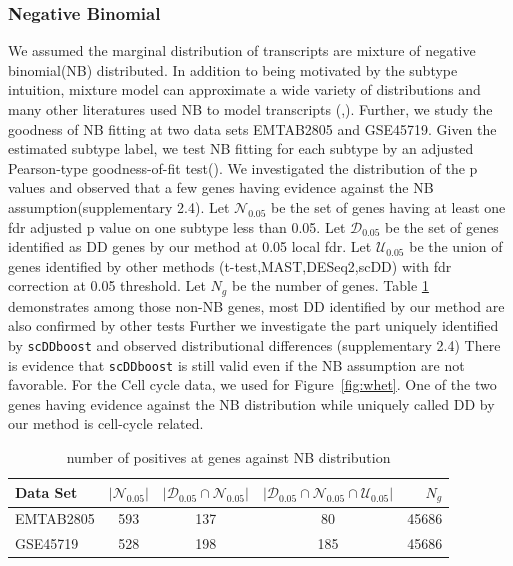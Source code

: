 \documentclass[aoas,preprint]{imsart}
\begin{document}
\subsubsection{Negative Binomial}

We assumed the marginal distribution of transcripts are mixture of negative binomial(NB) distributed. 
In addition to being motivated by the subtype intuition, mixture model can approximate a wide variety of distributions and
many other literatures used NB to model transcripts (\cite{ref:Des},\cite{Chen:2018aa}). 
Further, we study the goodness of NB fitting at two data sets EMTAB2805 and GSE45719. 
Given the estimated subtype label, we test NB fitting for each subtype by an adjusted Pearson-type goodness-of-fit test(\cite{Yin:2013aa}).
We investigated the distribution of the p values and observed that a few genes having evidence against the NB assumption(supplementary 2.4). 
Let $\mathcal{N}_{0.05}$ be the set of genes having at least one fdr adjusted p value on one subtype less than 0.05.
Let $\mathcal{D}_{0.05}$ be the set of genes identified as DD genes by our method at 0.05 local fdr.
Let $\mathcal{U}_{0.05}$ be the union of genes identified by other methods (t-test,MAST,DESeq2,scDD) with fdr correction at 0.05 threshold. 
Let $N_g$ be the number of genes. 
Table \ref{tab:nb} demonstrates among those non-NB genes, most DD identified by our method are also confirmed by other tests 
Further we investigate the part uniquely identified by \texttt{scDDboost} and observed distributional differences (supplementary 2.4)
There is evidence that \texttt{scDDboost} is still valid even if the NB assumption are not favorable. For the Cell cycle data, we used for Figure~\ref{fig:whet}. 
One of the two genes having evidence against the NB distribution while uniquely called DD by our method is cell-cycle related. 
\begin{table}[htbp]
  \begin{center}
  \begin{tabular}{@{} lcccr @{}} %
      \toprule
      \cmidrule(r){1-5} %
      Data Set   & $|\mathcal{N}_{0.05}|$ &
      $|\mathcal{D}_{0.05} \cap \mathcal{N}_{0.05}| $ & $|\mathcal{D}_{0.05} \cap \mathcal{N}_{0.05} \cap \mathcal{U}_{0.05}|$ & $N_g$  \\
      \midrule
      EMTAB2805   &593 & 137 & 80 & 45686\\          
      GSE45719   & 528 & 198 & 185 & 45686\\
      
      \bottomrule
  \end{tabular}
  \caption{number of positives at genes against NB distribution}
  \label{tab:nb}
  \end{center}
\end{table}
\end{document}
